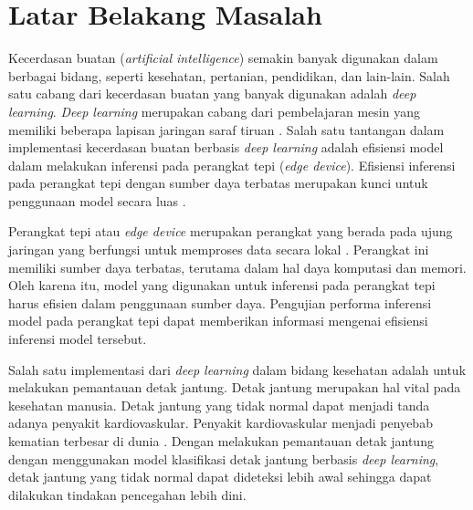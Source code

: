 
\section{Latar Belakang Masalah}
Kecerdasan buatan (\textit{artificial intelligence}) semakin banyak digunakan dalam berbagai bidang, seperti kesehatan, pertanian, pendidikan, dan lain-lain.
Salah satu cabang dari kecerdasan buatan yang banyak digunakan adalah \textit{deep learning}.
\textit{Deep learning} merupakan cabang dari pembelajaran mesin yang memiliki beberapa lapisan jaringan saraf tiruan \parencite{shindeReviewMachineLearning2018}.
Salah satu tantangan dalam implementasi kecerdasan buatan berbasis \textit{deep learning} adalah efisiensi model dalam melakukan inferensi pada perangkat tepi (\textit{edge device}).
Efisiensi inferensi pada perangkat tepi dengan sumber daya terbatas merupakan kunci untuk penggunaan model secara luas \parencite{ulkerReviewingInferencePerformance2020}.

Perangkat tepi atau \textit{edge device} merupakan perangkat yang berada pada ujung jaringan yang berfungsi untuk memproses data secara lokal \parencite{khouasTrainingMachineLearning2024}.
Perangkat ini memiliki sumber daya terbatas, terutama dalam hal daya komputasi dan memori.
Oleh karena itu, model yang digunakan untuk inferensi pada perangkat tepi harus efisien dalam penggunaan sumber daya.
Pengujian performa inferensi model pada perangkat tepi dapat memberikan informasi mengenai efisiensi inferensi model tersebut.

Salah satu implementasi dari \textit{deep learning} dalam bidang kesehatan adalah untuk melakukan pemantauan detak jantung.
Detak jantung merupakan hal vital pada kesehatan manusia.
Detak jantung yang tidak normal dapat menjadi tanda adanya penyakit kardiovaskular.
Penyakit kardiovaskular menjadi penyebab kematian terbesar di dunia \parencite{worldhealthorganizationCardiovascularDiseasesCVDs2021}.
Dengan melakukan pemantauan detak jantung dengan menggunakan model klasifikasi detak jantung berbasis \textit{deep learning}, detak jantung yang tidak normal dapat dideteksi lebih awal sehingga dapat dilakukan tindakan pencegahan lebih dini.


